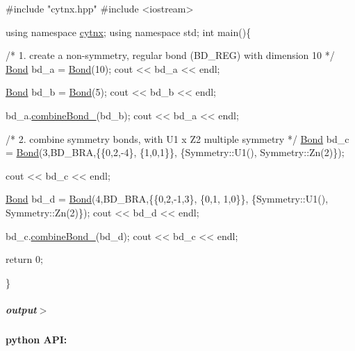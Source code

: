 \begin{DoxyCodeInclude}
\textcolor{preprocessor}{#include "cytnx.hpp"}
\textcolor{preprocessor}{#include <iostream>}


\textcolor{keyword}{using namespace }\hyperlink{namespacecytnx}{cytnx};
\textcolor{keyword}{using namespace }std;
\textcolor{keywordtype}{int} main()\{ 

    \textcolor{comment}{/* 1.}
\textcolor{comment}{        create a non-symmetry, regular bond (BD\_REG) }
\textcolor{comment}{        with dimension 10}
\textcolor{comment}{    */}
    \hyperlink{classcytnx_1_1Bond}{Bond} bd\_a = \hyperlink{classcytnx_1_1Bond}{Bond}(10);
    cout << bd\_a << endl;

    \hyperlink{classcytnx_1_1Bond}{Bond} bd\_b = \hyperlink{classcytnx_1_1Bond}{Bond}(5);
    cout << bd\_b << endl;


    bd\_a.\hyperlink{classcytnx_1_1Bond_ac21ab26ec469ac56ae78c9e4bbbe7040}{combineBond\_}(bd\_b);
    cout << bd\_a << endl;


    \textcolor{comment}{/* 2.}
\textcolor{comment}{        combine symmetry bonds, }
\textcolor{comment}{        with U1 x Z2 multiple symmetry }
\textcolor{comment}{    */}
    \hyperlink{classcytnx_1_1Bond}{Bond} bd\_c = \hyperlink{classcytnx_1_1Bond}{Bond}(3,BD\_BRA,\{\{0,2,-4\},
                               \{1,0,1\}\},
                              \{Symmetry::U1(),
                               Symmetry::Zn(2)\});
                                
    cout << bd\_c << endl;

    \hyperlink{classcytnx_1_1Bond}{Bond} bd\_d = \hyperlink{classcytnx_1_1Bond}{Bond}(4,BD\_BRA,\{\{0,2,-1,3\},
                               \{0,1, 1,0\}\},
                              \{Symmetry::U1(),
                               Symmetry::Zn(2)\});
    cout << bd\_d << endl;

    
    bd\_c.\hyperlink{classcytnx_1_1Bond_ac21ab26ec469ac56ae78c9e4bbbe7040}{combineBond\_}(bd\_d);
    cout << bd\_c << endl;

    \textcolor{keywordflow}{return} 0;
    


\}

\end{DoxyCodeInclude}
 \subparagraph*{output$>$}


\begin{DoxyVerbInclude}
\end{DoxyVerbInclude}
 \paragraph*{python A\+PI\+:}


